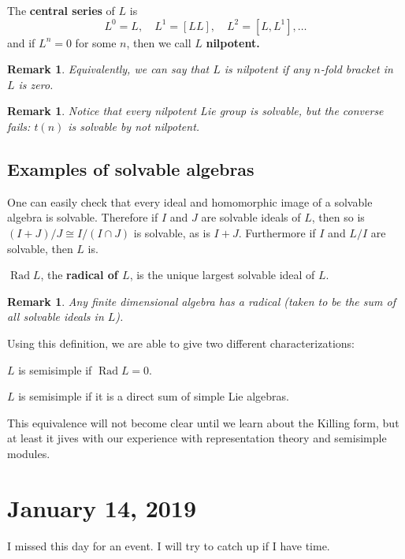 \documentclass[12pt]{article}
\theoremstyle{nonumberbreak}
\theoremstyle{changebreak}
\newenvironment{defprime}[1]
  {\renewcommand{\thethm}{\ref{#1}$'$}%
   \addtocounter{thm}{-1}%
   \begin{defn}}
  {\end{defn}}
\theoremstyle{nonumberbreak}
\theoremstyle{change}
\newtheorem{rmk}[thm]{Remark}
\DeclareMathOperator{\Rad}{Rad}
\begin{document}
\begin{defn}
	The \textbf{central series} of $L$ is 
	\[L^0=L,\quad L^1=[LL],\quad L^2=[L,L^1],\dots\]
	and if $L^n=0$ for some $n$, then we call $L$ \textbf{nilpotent.}
\end{defn}
\begin{rmk}
	Equivalently, we can say that $L$ is nilpotent if \textit{any $n$-fold bracket} in $L$ is zero.
\end{rmk}
\begin{rmk}
	Notice that every nilpotent Lie group is solvable, but the converse fails: $t(n)$ is solvable by not nilpotent.
\end{rmk}

\subsection{Examples of solvable algebras}
One can easily check that every ideal and homomorphic image of a solvable algebra is solvable. Therefore if $I$ and $J$ are solvable ideals of $L$, then 
so is $(I+J)/J\cong I/(I\cap J)$ is solvable, as is $I+J$. Furthermore if $I$ and $L/I$ are solvable, then $L$ is.

\begin{defn}
	$\Rad L$, the \textbf{radical of $L$}, is the unique largest solvable ideal of $L$.
\end{defn}
\begin{rmk}
	Any finite dimensional algebra has a radical (taken to be the sum of all solvable ideals in $L$).
\end{rmk}

Using this definition, we are able to give two different characterizations:
\begin{defn}\label{def-semisimple}
	$L$ is semisimple if $\Rad L=0$.
\end{defn}
\begin{defprime}{def-semisimple}[Semisimple Lie Algebra]
	$L$ is semisimple if it is a direct sum of simple Lie algebras.
\end{defprime}
This equivalence will not become clear until we learn about the Killing form, but at least it jives
with our experience with representation theory and semisimple modules.

\section{January 14, 2019}
I missed this day for an event. I will try to catch up if I have time.
\end{document}
